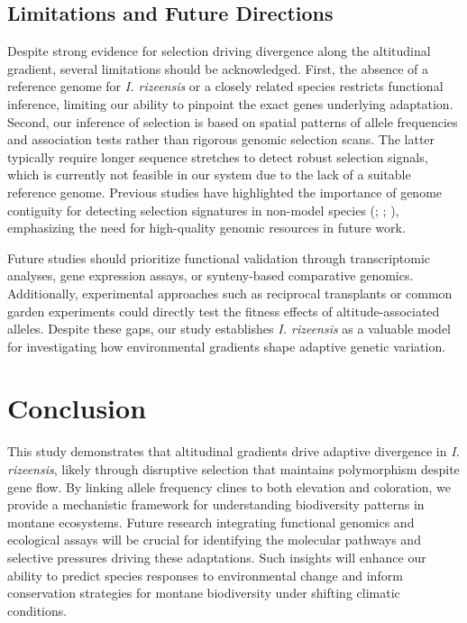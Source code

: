 \documentclass[9pt,a4paper,twoside]{rho-class/rho}
\begin{document}
\subsection{Limitations and Future Directions}

Despite strong evidence for selection driving divergence along the altitudinal gradient, several limitations should be acknowledged. First, the absence of a reference genome for \textit{I. rizeensis} or a closely related species restricts functional inference, limiting our ability to pinpoint the exact genes underlying adaptation. Second, our inference of selection is based on spatial patterns of allele frequencies and association tests rather than rigorous genomic selection scans. The latter typically require longer sequence stretches to detect robust selection signals, which is currently not feasible in our system due to the lack of a suitable reference genome. Previous studies have highlighted the importance of genome contiguity for detecting selection signatures in non-model species (\cite{hoban2016finding}; \cite{fumagalli2013assessing}; \cite{lotterhos2019effect}), emphasizing the need for high-quality genomic resources in future work.

Future studies should prioritize functional validation through transcriptomic analyses, gene expression assays, or synteny-based comparative genomics. Additionally, experimental approaches such as reciprocal transplants or common garden experiments could directly test the fitness effects of altitude-associated alleles. Despite these gaps, our study establishes \textit{I. rizeensis} as a valuable model for investigating how environmental gradients shape adaptive genetic variation.

\section{Conclusion}

This study demonstrates that altitudinal gradients drive adaptive divergence in \textit{I. rizeensis}, likely through disruptive selection that maintains polymorphism despite gene flow. By linking allele frequency clines to both elevation and coloration, we provide a mechanistic framework for understanding biodiversity patterns in montane ecosystems. Future research integrating functional genomics and ecological assays will be crucial for identifying the molecular pathways and selective pressures driving these adaptations. Such insights will enhance our ability to predict species responses to environmental change and inform conservation strategies for montane biodiversity under shifting climatic conditions.
\end{document}
